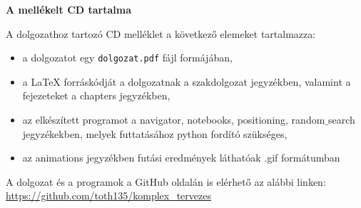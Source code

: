 \pagestyle{empty}

\noindent \textbf{\Large A mellékelt CD tartalma}

\vskip 1cm

A dolgozathoz tartozó CD melléklet a következő elemeket tartalmazza:

\begin{itemize}
\item a dolgozatot egy \texttt{dolgozat.pdf} fájl formájában,
\item a LaTeX forráskódját a dolgozatnak a szakdolgozat jegyzékben, valamint a fejezeteket a chapters jegyzékben,
\item az elkészített programot a navigator, notebooks, positioning, random$\_$search jegyzékekben, melyek futtatásához python fordító szükséges,
\item az animations jegyzékben futási eredmények láthatóak .gif formátumban
\end{itemize}

A dolgozat és a programok a GitHub oldalán is elérhető az alábbi linken:\\
\url{https://github.com/toth135/komplex_tervezes}
